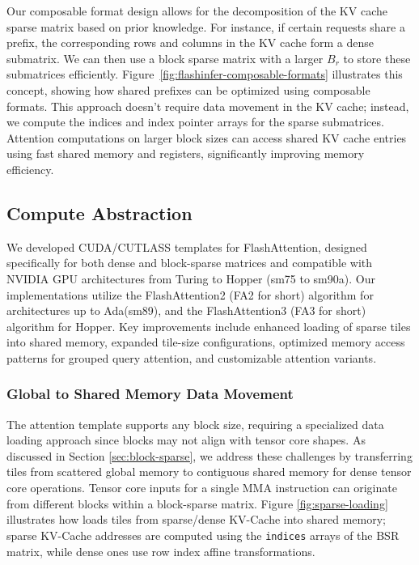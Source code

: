 Our composable format design allows for the decomposition of the KV cache sparse matrix based on prior knowledge. For instance, if certain requests share a prefix, the corresponding rows and columns in the KV cache form a dense submatrix. We can then use a block sparse matrix with a larger $B_r$ to store these submatrices efficiently. Figure~\ref{fig:flashinfer-composable-formats} illustrates this concept, showing how shared prefixes can be optimized using composable formats. This approach doesn't require data movement in the KV cache; instead, we compute the indices and index pointer arrays for the sparse submatrices. Attention computations on larger block sizes can access shared KV cache entries using fast shared memory and registers, significantly improving memory efficiency.

\subsection{Compute Abstraction}
\label{sec:compute-abs}

We developed CUDA/CUTLASS \cite{cutlass} templates for FlashAttention, designed specifically for both dense and block-sparse matrices and compatible with NVIDIA GPU architectures from Turing to Hopper (sm75 to sm90a). Our implementations utilize the FlashAttention2 (FA2 for short) algorithm \cite{dao2023flashattention2} for architectures up to Ada(sm89), and the FlashAttention3 (FA3 for short) algorithm \cite{jay2024flashattention3} for Hopper. Key improvements include enhanced loading of sparse tiles into shared memory, expanded tile-size configurations, optimized memory access patterns for grouped query attention, and customizable attention variants.

\subsubsection{Global to Shared Memory Data Movement}
\label{sec:sparse-loading}

The \sys attention template supports any block size, requiring a specialized data loading approach since blocks may not align with tensor core shapes. As discussed in Section \ref{sec:block-sparse}, we address these challenges by transferring tiles from scattered global memory to contiguous shared memory for dense tensor core operations. Tensor core inputs for a single MMA instruction can originate from different blocks within a block-sparse matrix. Figure \ref{fig:sparse-loading} illustrates how \sys loads tiles from sparse/dense KV-Cache into shared memory; sparse KV-Cache addresses are computed using the \texttt{indices} arrays of the BSR matrix, while dense ones use row index affine transformations.

